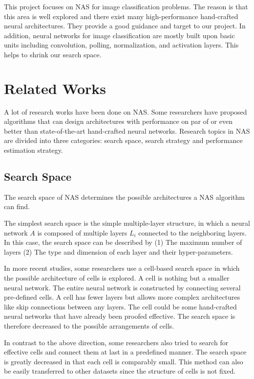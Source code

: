 \documentclass[conference]{IEEEtran}
\begin{document}
      This project focuses on NAS for image classification problems. The reason is that this area is well explored and there exist many high-performance hand-crafted neural architectures. They provide a good guidance and target to our project. In addition, neural networks for image classification are mostly built upon basic units including convolution, polling, normalization, and activation layers. This helps to shrink our search space.
    


    \section{Related Works}
    A lot of research works have been done on NAS. Some researchers have proposed algorithms that can design architectures with performance on par of or even better than state-of-the-art hand-crafted neural networks. Research topics in NAS are divided into three categories: search space, search strategy and performance estimation strategy.
    
    \subsection{Search Space}
    
    The search space of NAS determines the possible architectures a NAS algorithm can find.

    The simplest search space is the simple multiple-layer structure, in which a neural network $A$ is composed of multiple layers $L_i$ connected to the neighboring layers. In this case, the search space can be described by (1) The maximum number of layers (2) The type and dimension of each layer and their hyper-parameters\cite{chollet2017xception}\cite{baker2016designing}. 

    In more recent studies, some researchers use a cell-based search space in which the possible architecture of cells is explored. A cell is nothing but a smaller neural network. The entire neural network is constructed by connecting several pre-defined cells. A cell has fewer layers but allows more complex architectures like skip connections between any layers\cite{cai2018path}\cite{real2018regularized}. The cell could be some hand-crafted neural networks that have already been proofed effective. The search space is therefore decreased to the possible arrangements of cells.

    In contrast to the above direction, some researchers also tried to search for effective cells and connect them at last in a predefined manner\cite{zoph2018learning}\cite{cai2018path}. The search space is greatly decreased in that each cell is comparably small. This method can also be easily transferred to other datasets\cite{zoph2018learning} since the structure of cells is not fixed.
\end{document}
